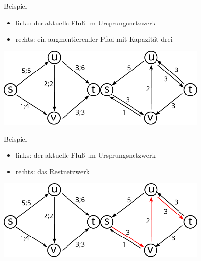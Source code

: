 \documentclass[aspectratio=1610, 11pt]{beamer}
\begin{document}
\begin{frame}
\begin{overprint}
\begin{exampleblock}{Beispiel}
			\begin{itemize}
				\item links: der aktuelle Flu\ss\ im Ursprungsnetzwerk
				\item rechts: ein augmentierender Pfad mit Kapazit\"at drei
			\end{itemize}
		\end{exampleblock}
		\includegraphics[height=40mm]{./images/flow12.pdf}\hfill\includegraphics[height=40mm]{./images/flow13.pdf}
\begin{exampleblock}{Beispiel}
			\begin{itemize}
				\item links: der aktuelle Flu\ss\ im Ursprungsnetzwerk
				\item rechts: das Restnetzwerk
			\end{itemize}
		\end{exampleblock}
		\includegraphics[height=40mm]{./images/flow12.pdf}\hfill\includegraphics[height=40mm]{./images/flow14.pdf}

\end{overprint}
\end{frame}
\end{document}
